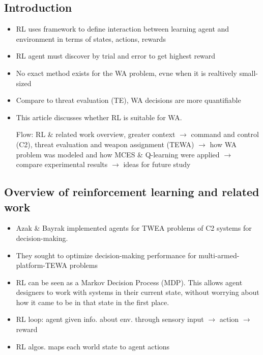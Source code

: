 \documentclass[12pt]{article} %
\begin{document}
\subsection*{Introduction}
\begin{itemize}
    \item RL uses framework to define interaction between learning agent and environment in terms of states, actions, rewards
    \item RL agent must discover by trial and error to get highest reward 
    \item No exact method exists for the WA problem, evne when it is realtively small-sized 
    \item Compare to threat evaluation (TE), WA decisions are more quantifiable
    \item This article discusses whether RL is suitable for WA. 
    
    Flow: RL \& related work overview, greater context $\rightarrow$ command and control (C2), threat evaluation and weapon assignment (TEWA)
    $\rightarrow$ how WA problem was modeled and how MCES \& Q-learning were applied $\rightarrow$ compare experimental results 
    $\rightarrow$ ideas for future study
\end{itemize}

\subsection*{Overview of reinforcement learning and related work}
\begin{itemize}
    \item Azak \& Bayrak implemented agents for TWEA problems of C2 systems for decision-making.
    \item They sought to optimize decision-making performance for multi-armed-platform-TEWA problems 
    \item RL can be seen as a Markov Decision Process (MDP). This allows agent designers to work with systems 
    in their current state, without worrying about how it came to be in that state in the first place. 
    \item RL loop: agent given info. about env. through sensory input $\rightarrow$ action $\rightarrow$ reward
    \item RL algos. maps each world state to agent actions
\end{itemize}
\end{document}
